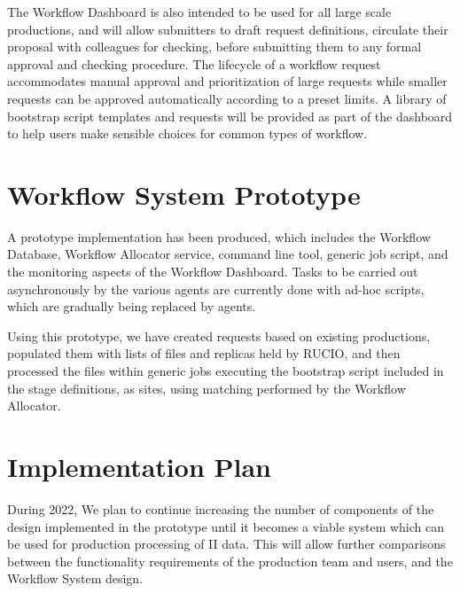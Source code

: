 \documentclass[../main-v1.tex]{subfiles}
\begin{document}
The Workflow Dashboard is also intended to be used for all large scale productions, and will allow submitters to draft request definitions, circulate their proposal with colleagues for checking, before submitting them to any formal approval and checking procedure. The lifecycle of a workflow request accommodates manual approval and prioritization of large requests while smaller requests can be approved automatically according to a preset limits. A library of bootstrap script templates and requests will be provided as part of the dashboard to help users make sensible choices for common types of workflow.

\section{Workflow System Prototype}
\label{sec:flow:prototype}

A prototype implementation has been produced, which includes the Workflow Database, Workflow Allocator service, command line tool, generic job script, and the monitoring aspects of the Workflow Dashboard. Tasks to be carried out asynchronously by the various agents are currently done with ad-hoc scripts, which are gradually being replaced by agents.

Using this prototype, we have created requests based on existing productions, populated them with lists of files and replicas held by RUCIO, and then processed the files within generic jobs executing the bootstrap script included in the stage definitions, as sites, using matching performed by the Workflow Allocator.

\section{Implementation Plan }
\label{sec:flow:implementation}

During 2022, We plan to continue increasing the number of components of the design implemented in the prototype until it becomes a viable system which can be used for production processing of  II data. This will allow further comparisons between the functionality requirements of the production team and users, and the Workflow System design.

\end{document}
